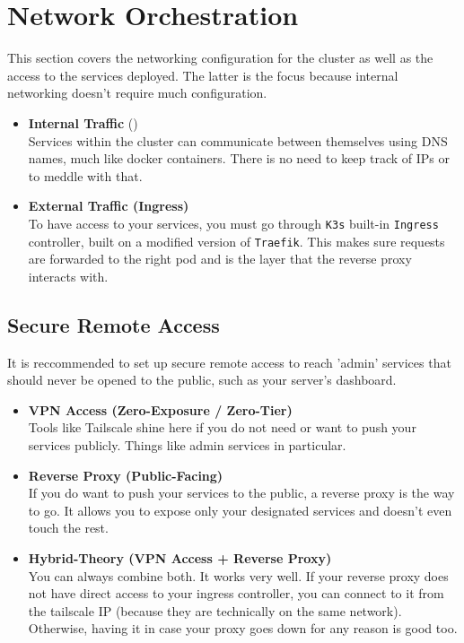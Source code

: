 \section{Network Orchestration}\label{section:pod-network}
This section covers the networking configuration for the cluster as well as the access to the services deployed. The latter is the focus because internal networking doesn't require much configuration.

\begin{itemize}
	\item \textbf{Internal Traffic} () \\
	Services within the cluster can communicate between themselves using DNS names, much like docker containers. 
	There is no need to keep track of IPs or to meddle with that.
	
	\item \textbf{External Traffic (Ingress)} \\
	To have access to your services, you must go through \texttt{K3s} built-in \texttt{Ingress} controller, built on a modified version of \texttt{Traefik}. This makes sure requests are forwarded to the right pod and is the layer that the \gls{reverse proxy} interacts with.
\end{itemize}




\subsection{Secure Remote Access}
It is reccommended to set up secure remote access to reach 'admin' services that should never be opened to the public, such as your server's dashboard. 

\begin{itemize}
	\item \textbf{VPN Access (Zero-Exposure / Zero-Tier)} \\
	Tools like Tailscale shine here if you do not need or want to push your services publicly. Things like admin services in particular.
	\item \textbf{Reverse Proxy (Public-Facing)} \\
	If you do want to push your services to the public, a reverse proxy is the way to go. It allows you to expose only your designated services and doesn't even touch the rest.
	\item \textbf{Hybrid-Theory (VPN Access + Reverse Proxy)} \\
	You can always combine both. It works very well. If your reverse proxy does not have direct access to your ingress controller, you can connect to it from the tailscale IP (because they are technically on the same network). Otherwise, having it in case your proxy goes down for any reason is good too.
\end{itemize}